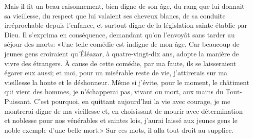 Mais il fit un beau raisonnement, bien digne de son âge,
	du rang que lui donnait sa vieillesse,
	du respect que lui valaient ses cheveux blancs,
	de sa conduite irréprochable depuis l’enfance,
	et surtout digne de la législation sainte établie par Dieu.
Il s’exprima en conséquence, demandant qu’on l’envoyât sans tarder au séjour des morts:
	«Une telle comédie est indigne de mon âge.
Car beaucoup de jeunes gens croiraient qu’Éléazar, à quatre-vingt-dix ans,
	adopte la manière de vivre des étrangers.
À cause de cette comédie, par ma faute, ils se laisseraient égarer eux aussi;
	et moi, pour un misérable reste de vie,
	j’attirerais sur ma vieillesse la honte et le déshonneur.
Même si j’évite, pour le moment, le châtiment qui vient des hommes,
	je n’échapperai pas, vivant ou mort, aux mains du Tout-Puissant.
C’est pourquoi, en quittant aujourd’hui la vie avec courage,
	je me montrerai digne de ma vieillesse
	et, en choisissant de mourir avec détermination et noblesse
		pour nos vénérables et saintes lois,
	j’aurai laissé aux jeunes gens le noble exemple d’une belle mort.»
Sur ces mots, il alla tout droit au supplice.
